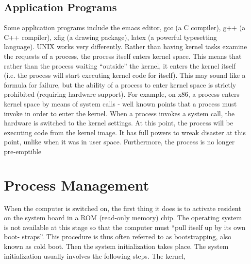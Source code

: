 \documentclass{article}
\begin{document}
\subsection{Application Programs}
Some application programs include the emacs editor, gcc (a C compiler), g++ (a C++
compiler), xfig (a drawing package), latex (a powerful typesetting language).
UNIX works very differently. Rather than having kernel tasks examine the requests of
a process, the process itself enters kernel space. This means that rather than the
process waiting “outside” the kernel, it enters the kernel itself (i.e. the process will
start executing kernel code for itself).
This may sound like a formula for failure, but the ability of a process to enter kernel
space is strictly prohibited (requiring hardware support). For example, on x86, a process enters kernel space by means of system calls - well known points that a
process must invoke in order to enter the kernel.
When a process invokes a system call, the hardware is switched to the kernel settings.
At this point, the process will be executing code from the kernel image. It has full
powers to wreak disaster at this point, unlike when it was in user space. Furthermore,
the process is no longer pre-emptible

\section{Process Management}
When the computer is switched on, the first thing it does is to activate resident on the
system board in a ROM (read-only memory) chip. The operating system is not
available at this stage so that the computer must “pull itself up by its own boot-
straps”. This procedure is thus often referred to as bootstrapping, also known as cold
boot. Then the system initialization takes place. The system initialization usually
involves the following steps. The kernel,
\end{document}
